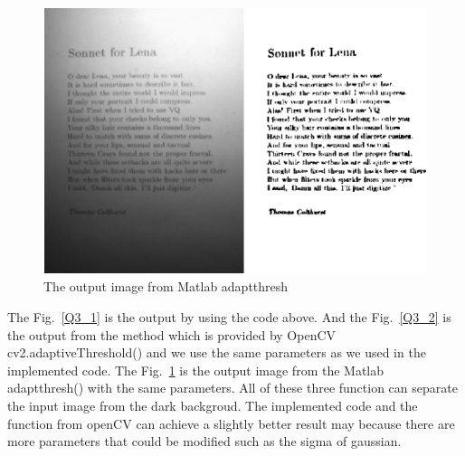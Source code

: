 \documentclass[12pt]{article}
\begin{document}
\begin{enumerate}[leftmargin=\labelsep]
\begin{enumerate}
\begin{figure}[H]
        \centering
        \includegraphics[]{Figure/A2mo.png}
        \caption{The output image from Matlab adaptthresh}
        \label{Q3_3}
\end{figure}

The Fig.~\ref{Q3_1} is the output by using the code above. And the Fig.~\ref{Q3_2} is the output from the method which is provided by OpenCV cv2.adaptiveThreshold() and we use the same parameters as we used in the implemented code. The Fig.~\ref{Q3_3} is the output image from the Matlab adaptthresh() with the same parameters. All of these three function can separate the input image from the dark backgroud. The implemented code and the function from openCV can achieve a slightly better result may because there are more parameters that could be modified such as the sigma of gaussian. 

\end{enumerate}



\end{enumerate}
\end{document}
